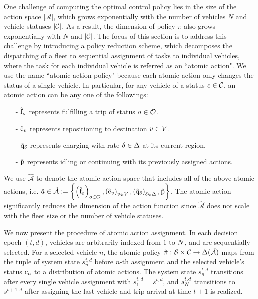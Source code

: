 One challenge of computing the optimal control policy lies in the size of the action space $\vert\mathcal{A}\vert$, which grows exponentially with the number of vehicles $N$ and vehicle statuses $|\mathcal{C}|$. As a result, the dimension of policy $\pi$ also grows exponentially with $N$ and $|\mathcal{C}|$. The focus of this section is to address this challenge by introducing a policy reduction scheme, which decomposes the dispatching of a fleet to sequential assignment of tasks to individual vehicles, where the task for each individual vehicle is referred as an ``atomic action". We use the name ``atomic action policy" because each atomic action only changes the status of a single vehicle. In particular, for any vehicle of a status $c_{} \in \mathcal{C}$, an atomic action can be any one of the followings: 
\begin{itemize}
    \item[-] $\hat{\mathrm{f}}_{o_{}}$ represents fulfilling a trip of status $o_{} \in \mathcal{O}$.
    \item[-] $\hat{\mathrm{e}}_{v}$ represents repositioning to destination $v \in V$.
    \item[-] $\hat{\mathrm{q}}_{\delta}$ represents charging with rate $\delta \in \Delta$ at its current region.
    \item[-] $\hat{\mathrm{p}}$ represents idling or continuing with its previously assigned actions. 
\end{itemize}
We use $\hat{\mathcal{A}}$ to denote the atomic action space that includes all of the above atomic actions, i.e. $\hat{a} \in \hat{\mathcal{A}} := \left\{\left(\hat{\mathrm{f}}_{o_{}}\right)_{o_{} \in \mathcal{O}}, \left(\hat{\mathrm{e}}_{v}\right)_{v \in V}, \left(\hat{\mathrm{q}}_{\delta}\right)_{\delta \in \Delta}, \hat{\mathrm{p}} \right\}$. The atomic action significantly reduces the dimension of the action function since $\hat{\mathcal{A}}$ does not scale with the fleet size or the number of vehicle statuses. 

We now present the procedure of atomic action assignment. In each decision epoch $(t, d)$, vehicles are arbitrarily indexed from $1$ to $N$, and are sequentially selected. For a selected vehicle $n$, the atomic policy $\hat{\pi}: \mathcal{S} \times \mathcal{C} \rightarrow \Delta(\hat{\mathcal{A}})$ maps from the tuple of system state $s^{t,d}_n$ before $n$-th assignment and the selected vehicle's status $c_{n}$ to a distribution of atomic actions. The system state $s^{t,d}_n$ transitions after every single vehicle assignment with $s_1^{t,d}=s^{t,d}$, and $s_{N}^{t,d}$ transitions to $s^{t+1,d}$ after assigning the last vehicle and trip arrival at time $t+1$ is realized.


